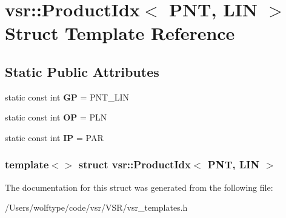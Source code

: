 \hypertarget{structvsr_1_1_product_idx_3_01_p_n_t_00_01_l_i_n_01_4}{\section{vsr\-:\-:Product\-Idx$<$ P\-N\-T, L\-I\-N $>$ Struct Template Reference}
\label{structvsr_1_1_product_idx_3_01_p_n_t_00_01_l_i_n_01_4}
}
\subsection*{Static Public Attributes}
\begin{DoxyCompactItemize}
\item 
\hypertarget{structvsr_1_1_product_idx_3_01_p_n_t_00_01_l_i_n_01_4_a9a0ebe2b360ff4e3fa939de36cc8ce04}{static const int {\bfseries G\-P} = P\-N\-T\-\_\-\-L\-I\-N}\label{structvsr_1_1_product_idx_3_01_p_n_t_00_01_l_i_n_01_4_a9a0ebe2b360ff4e3fa939de36cc8ce04}

\item 
\hypertarget{structvsr_1_1_product_idx_3_01_p_n_t_00_01_l_i_n_01_4_ad2b6881cdff8541b8cf6c7d1b61f57bc}{static const int {\bfseries O\-P} = P\-L\-N}\label{structvsr_1_1_product_idx_3_01_p_n_t_00_01_l_i_n_01_4_ad2b6881cdff8541b8cf6c7d1b61f57bc}

\item 
\hypertarget{structvsr_1_1_product_idx_3_01_p_n_t_00_01_l_i_n_01_4_a599a3cdc46c0bfa5c7a77af7cfa19141}{static const int {\bfseries I\-P} = P\-A\-R}\label{structvsr_1_1_product_idx_3_01_p_n_t_00_01_l_i_n_01_4_a599a3cdc46c0bfa5c7a77af7cfa19141}

\end{DoxyCompactItemize}
\subsubsection*{template$<$$>$ struct vsr\-::\-Product\-Idx$<$ P\-N\-T, L\-I\-N $>$}



The documentation for this struct was generated from the following file\-:\begin{DoxyCompactItemize}
\item 
/\-Users/wolftype/code/vsr/\-V\-S\-R/vsr\-\_\-templates.\-h\end{DoxyCompactItemize}
